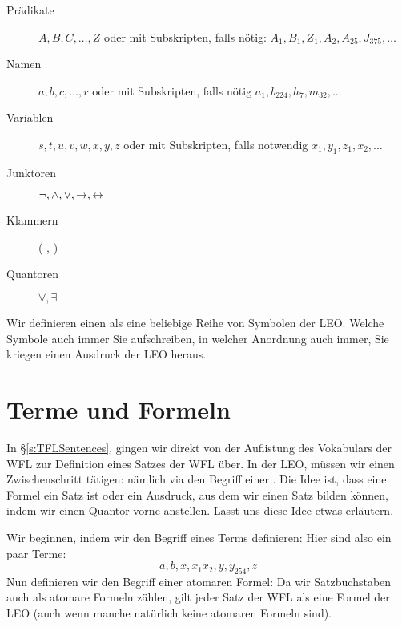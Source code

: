 \begin{description}
\item[Prädikate] $A,B,C,\ldots,Z$ oder 
mit Subskripten, falls nötig: $A_1, B_1,Z_1,A_2,A_{25},J_{375},\ldots$
\item[Namen] $a,b,c,\ldots, r$ oder
mit Subskripten, falls nötig $a_1, b_{224}, h_7, m_{32},\ldots$
\item[Variablen] $s, t, u, v, w, x, y, z$ oder
mit Subskripten, falls notwendig $x_1, y_1, z_1, x_2,\ldots$
\item[Junktoren]  $\neg,\wedge,\vee,\rightarrow,\leftrightarrow$
\item[Klammern] ( , )
\item[Quantoren]  $\forall, \exists$
\end{description}
Wir definieren einen  als eine beliebige Reihe von Symbolen der LEO. Welche Symbole auch immer Sie aufschreiben, in welcher Anordnung auch immer, Sie kriegen einen Ausdruck der LEO heraus.

\section{Terme und Formeln}
\label{s:TermsFormulas}

In \S\ref{s:TFLSentences}, gingen wir direkt von der Auflistung des Vokabulars der WFL zur Definition eines Satzes der WFL über. In der LEO, müssen wir einen Zwischenschritt tätigen: nämlich via den Begriff einer . Die Idee ist, dass eine Formel ein Satz ist oder ein Ausdruck, aus dem wir einen Satz bilden können, indem wir einen Quantor vorne anstellen. Lasst uns diese Idee etwas erläutern.

Wir beginnen, indem wir den Begriff eines Terms definieren: 
Hier sind also ein paar Terme:
	$$a, b, x, x_1 x_2, y, y_{254}, z$$
Nun definieren wir den Begriff einer atomaren Formel:
Da wir Satzbuchstaben auch als atomare Formeln zählen, gilt jeder Satz der WFL als eine Formel der LEO (auch wenn manche natürlich keine atomaren Formeln sind).

